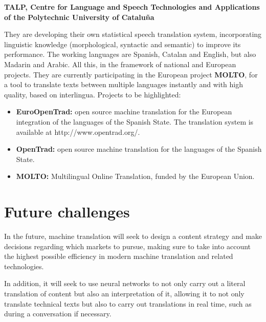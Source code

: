 \documentclass[a4paper]{article}
\theoremstyle{plain}
\theoremstyle{definition}
\begin{document}
    
   \begin{flushleft}
    \textbf{TALP, Centre for Language and Speech Technologies and Applications of the Polytechnic University of Cataluña}
   \end{flushleft}
    They are developing their own statistical speech translation system, incorporating linguistic knowledge (morphological, syntactic and semantic) to improve its performance. The working languages are Spanish, Catalan and English, but also Madarin and Arabic. All this, in the framework of national and European projects. They are currently participating in the European project \textbf{MOLTO}, for a tool to translate texts between multiple languages instantly and with high quality, based on interlingua. Projects to be highlighted:
    \begin{itemize}
        \item \textbf{EuroOpenTrad: }open source machine translation for the European integration of the languages of the Spanish State. The translation system is available at http://www.opentrad.org/.
        \item\textbf{OpenTrad: }open source machine translation for the languages of the Spanish State.
        \item \textbf{MOLTO: }Multilingual Online Translation, funded by the European Union.
    \end{itemize}

   
  



	\label{sec:examples}
	\section{Future challenges}
	\label{sec:examples}

	In the future, machine translation will seek to design a content strategy and make decisions regarding which markets to pursue, making sure to take into account the highest possible efficiency in modern machine translation and related technologies.\par

    In addition, it will seek to use neural networks to not only carry out a literal translation of content but also an interpretation of it, allowing it to not only translate technical texts but also to carry out translations in real time, such as during a conversation if necessary.\par
\end{document}
